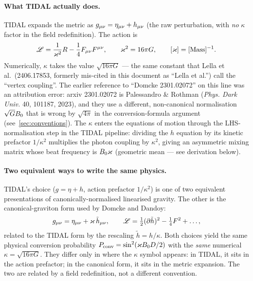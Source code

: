\paragraph*{What TIDAL actually does.}
TIDAL expands the metric as $g_{\mu\nu} = \eta_{\mu\nu} + h_{\mu\nu}$ (the raw
perturbation, with \emph{no} $\kappa$ factor in the field redefinition). The
action is
\begin{equation*}
    \mathscr{L} = \frac{1}{\varkappa^2} R - \frac{1}{4} F_{\mu\nu} F^{\mu\nu},
    \qquad
    \varkappa^2 = 16\pi G,
    \qquad
    [\varkappa] = [\text{Mass}]^{-1}.
\end{equation*}
Numerically, $\kappa$ takes the value $\sqrt{16\pi G}$ — the same constant that
Lella et al.\ (2406.17853, formerly mis-cited in this document as ``Lella et al.'')
call the ``vertex coupling''. The earlier reference to ``Domcke 2301.02072'' on
this line was an attribution error: arxiv 2301.02072 is Palessandro \& Rothman
(\emph{Phys. Dark Univ.} 40, 101187, 2023), and they use a different,
non-canonical normalisation $\sqrt{G}B_0$ that is wrong by $\sqrt{4\pi}$
in the conversion-formula argument (see~\cref{sec:conventions}).
The $\kappa$ enters the equations of motion through the LHS-normalisation step
in the TIDAL pipeline: dividing the $h$ equation by its kinetic prefactor
$1/\kappa^2$ multiplies the photon coupling by $\kappa^2$, giving an
asymmetric mixing matrix whose beat frequency is $B_0\varkappa$ (geometric
mean — see derivation below).

\paragraph*{Two equivalent ways to write the same physics.}
TIDAL's choice ($g = \eta + h$, action prefactor $1/\kappa^2$) is one of two
equivalent presentations of canonically-normalised linearised gravity. The
other is the canonical-graviton form used by Domcke and Dandoy:
\begin{equation*}
    g_{\mu\nu} = \eta_{\mu\nu} + \varkappa\, \tilde{h}_{\mu\nu},
    \qquad
    \mathscr{L} = \tfrac{1}{2}(\partial \tilde{h})^2 - \tfrac{1}{4} F^2 + \dots,
\end{equation*}
related to the TIDAL form by the rescaling $\tilde{h} = h/\kappa$. Both choices
yield the same physical conversion probability $P_\mathrm{conv} = \sin^2(\varkappa B_0
D/2)$ with the \emph{same} numerical $\kappa = \sqrt{16\pi G}$. They differ
only in where the $\kappa$ symbol appears: in TIDAL, it sits in the action
prefactor; in the canonical form, it sits in the metric expansion. The two are
related by a field redefinition, not a different convention.

